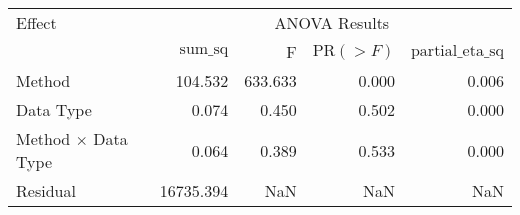 \begin{small}
\begin{adjustbox}{width=\textwidth}
\begin{tabular}{@{}lrrrr@{}}
\toprule
Effect & \multicolumn{4}{c}{ANOVA Results} \\
\cmidrule(l){2-5}
 & $\text{sum\_sq}$ & F & $\text{PR}(>F)$ & $\text{partial\_eta\_sq}$ \\
\midrule
Method & 104.532 & 633.633 & 0.000 & 0.006 \\
Data Type & 0.074 & 0.450 & 0.502 & 0.000 \\
Method $\times$ Data Type & 0.064 & 0.389 & 0.533 & 0.000 \\
Residual & 16735.394 & NaN & NaN & NaN \\
\bottomrule
\end{tabular}%
\end{adjustbox}
\end{small}
